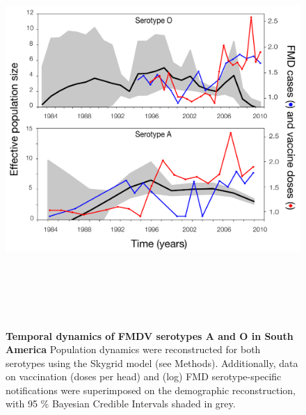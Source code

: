 \documentclass[10pt]{article}
\begin{document}
\begin{figure}[!ht]
\begin{center}
\includegraphics[width=15cm,height=15cm]{FIGURES/skygrid.pdf}
\end{center}
\caption{
{\bf Temporal dynamics of FMDV serotypes A and O in South America} Population dynamics were reconstructed for both serotypes using the Skygrid model (see Methods). Additionally, data on vaccination  (doses per head) and (log) FMD serotype-specific notifications were superimposed on the demographic reconstruction, with 95 \% Bayesian Credible Intervals shaded in grey.\\
}
\label{fig:skygrid}
\end{figure}
\end{document}
